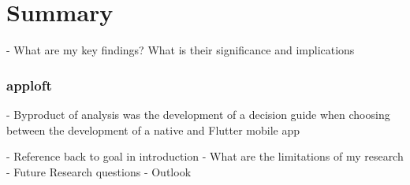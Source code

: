 \chapter{Summary}
- What are my key findings? What is their significance and implications

\subsection{apploft}
- Byproduct of analysis was the development of a decision guide when choosing
between the development of a native and Flutter mobile app

- Reference back to goal in introduction
- What are the limitations of my research
- Future Research questions
- Outlook
